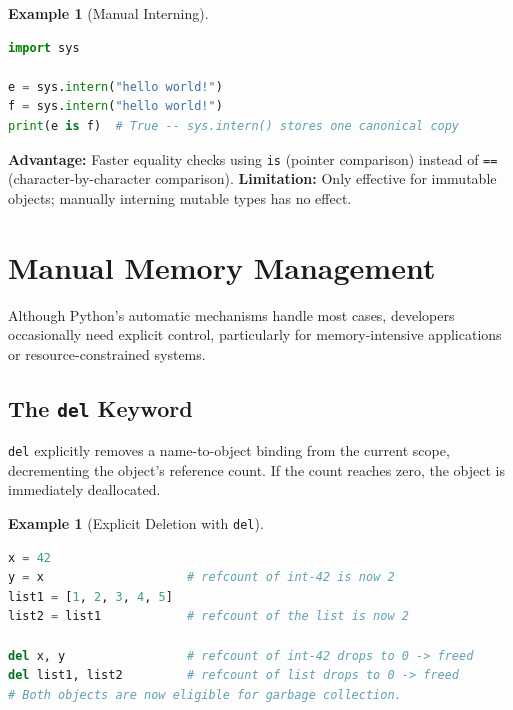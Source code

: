 \documentclass[11pt, a4paper, notitlepage]{report}
\theoremstyle{definition}
\theoremstyle{remark}
\theoremstyle{definition}
\newtheorem{example}[theorem]{Example}
\begin{document}
\begin{example}[Manual Interning]
\leavevmode
\begin{lstlisting}[language=Python]
import sys

e = sys.intern("hello world!")
f = sys.intern("hello world!")
print(e is f)  # True -- sys.intern() stores one canonical copy
\end{lstlisting}
\end{example}

\begin{examtip}[title={Exam Tip: Interning Advantages and Limitations}]
\textbf{Advantage:} Faster equality checks using \texttt{is} (pointer comparison) instead of
\texttt{==} (character-by-character comparison). \textbf{Limitation:} Only effective for
immutable objects; manually interning mutable types has no effect.
\end{examtip}

\section{Manual Memory Management}
\label{sec:manual-mm}

Although Python's automatic mechanisms handle most cases, developers occasionally need explicit
control, particularly for memory-intensive applications or resource-constrained systems.

\subsection{The \texttt{del} Keyword}
\label{subsec:del}

\texttt{del} explicitly removes a name-to-object binding from the current scope, decrementing
the object's reference count. If the count reaches zero, the object is immediately deallocated.

\begin{example}[Explicit Deletion with \texttt{del}]
\leavevmode
\begin{lstlisting}[language=Python]
x = 42
y = x                    # refcount of int-42 is now 2
list1 = [1, 2, 3, 4, 5]
list2 = list1            # refcount of the list is now 2

del x, y                 # refcount of int-42 drops to 0 -> freed
del list1, list2         # refcount of list drops to 0 -> freed
# Both objects are now eligible for garbage collection.
\end{lstlisting}
\end{example}
\end{document}

